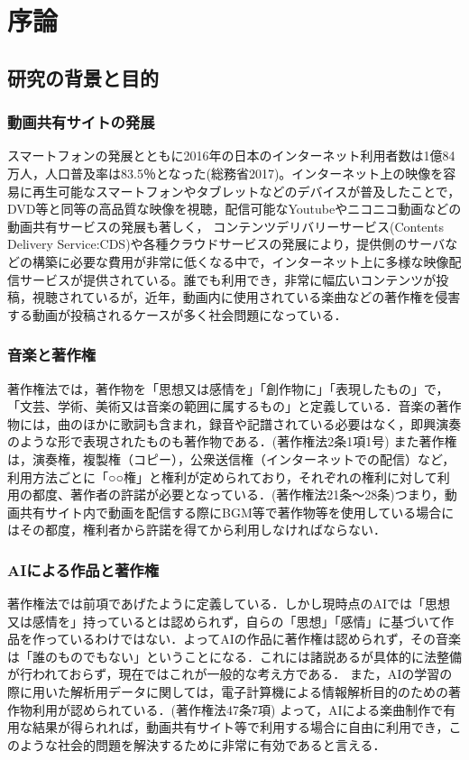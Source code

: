 \chapter{序論}
\section{研究の背景と目的}
\subsection{動画共有サイトの発展}
スマートフォンの発展とともに2016年の日本のインターネット利用者数は1億84万人，人口普及率は83.5％となった(総務省2017)。インターネット上の映像を容易に再生可能なスマートフォンやタブレットなどのデバイスが普及したことで，DVD等と同等の高品質な映像を視聴，配信可能なYoutube\cite{webpage}やニコニコ動画\cite{webpage9}などの動画共有サービスの発展も著しく，
コンテンツデリバリーサービス(Contents Delivery Service:CDS)や各種クラウドサービスの発展により，提供側のサーバなどの構築に必要な費用が非常に低くなる中で，インターネット上に多様な映像配信サービスが提供されている。誰でも利用でき，非常に幅広いコンテンツが投稿，視聴されているが，近年，動画内に使用されている楽曲などの著作権を侵害する動画が投稿されるケースが多く社会問題になっている．
\subsection{音楽と著作権}
著作権法では，著作物を「思想又は感情を」「創作物に」「表現したもの」で，「文芸、学術、美術又は音楽の範囲に属するもの」と定義している．音楽の著作物には，曲のほかに歌詞も含まれ，録音や記譜されている必要はなく，即興演奏のような形で表現されたものも著作物である．(著作権法2条1項1号)
また著作権は，演奏権，複製権（コピー），公衆送信権（インターネットでの配信）など，利用方法ごとに「○○権」と権利が定められており，それぞれの権利に対して利用の都度、著作者の許諾が必要となっている．(著作権法21条～28条)つまり，動画共有サイト内で動画を配信する際にBGM等で著作物等を使用している場合にはその都度，権利者から許諾を得てから利用しなければならない．
\newpage
\subsection{AIによる作品と著作権}
著作権法では前項であげたように定義している．しかし現時点のAIでは「思想又は感情を」持っているとは認められず，自らの「思想」「感情」に基づいて作品を作っているわけではない．よってAIの作品に著作権は認められず，その音楽は「誰のものでもない」ということになる．これには諸説あるが具体的に法整備が行われておらず，現在ではこれが一般的な考え方である．
また，AIの学習の際に用いた解析用データに関しては，電子計算機による情報解析目的のための著作物利用が認められている．(著作権法47条7項)
よって，AIによる楽曲制作で有用な結果が得られれば，動画共有サイト等で利用する場合に自由に利用でき，このような社会的問題を解決するために非常に有効であると言える．
